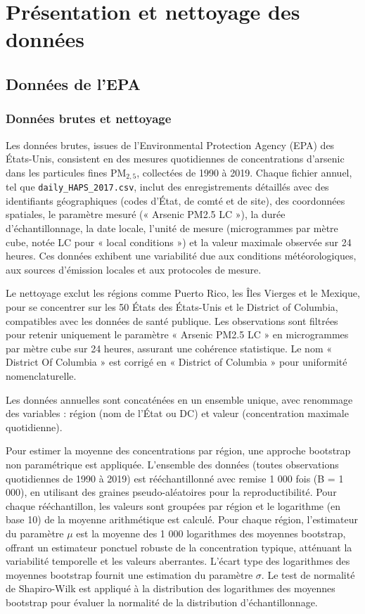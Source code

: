 \chapter{Présentation et nettoyage des données}
\label{chap:data}

\section{Données de l'EPA}

\subsection{Données brutes et nettoyage}

Les données brutes, issues de l'Environmental Protection Agency (EPA) \citep{epa_air_quality_system_2024} des États-Unis, consistent en des mesures quotidiennes de concentrations d'arsenic dans les particules fines PM$_{2{,}5}$, collectées de 1990 à 2019. Chaque fichier annuel, tel que \texttt{daily\_HAPS\_2017.csv}, inclut des enregistrements détaillés avec des identifiants géographiques (codes d'État, de comté et de site), des coordonnées spatiales, le paramètre mesuré (« Arsenic PM2.5 LC »), la durée d'échantillonnage, la date locale, l'unité de mesure (microgrammes par mètre cube, notée LC pour « local conditions ») et la valeur maximale observée sur 24 heures. Ces données exhibent une variabilité due aux conditions météorologiques, aux sources d'émission locales et aux protocoles de mesure.

Le nettoyage exclut les régions comme Puerto Rico, les Îles Vierges et le Mexique, pour se concentrer sur les 50 États des États-Unis et le District of Columbia, compatibles avec les données de santé publique. Les observations sont filtrées pour retenir uniquement le paramètre « Arsenic PM2.5 LC » en microgrammes par mètre cube sur 24 heures, assurant une cohérence statistique. Le nom « District Of Columbia » est corrigé en « District of Columbia » pour uniformité nomenclaturelle.

Les données annuelles sont concaténées en un ensemble unique, avec renommage des variables : région (nom de l'État ou DC) et valeur (concentration maximale quotidienne).

Pour estimer la moyenne des concentrations par région, une approche bootstrap non paramétrique est appliquée. L'ensemble des données (toutes observations quotidiennes de 1990 à 2019) est rééchantillonné avec remise 1 000 fois (B = 1 000), en utilisant des graines pseudo-aléatoires pour la reproductibilité. Pour chaque rééchantillon, les valeurs sont groupées par région et le logarithme (en base 10) de la moyenne arithmétique est calculé. Pour chaque région, l'estimateur du paramètre $\mu$ est la moyenne des 1 000 logarithmes des moyennes bootstrap, offrant un estimateur ponctuel robuste de la concentration typique, atténuant la variabilité temporelle et les valeurs aberrantes. L'écart type des logarithmes des moyennes bootstrap fournit une estimation du paramètre $\sigma$. Le test de normalité de Shapiro-Wilk est appliqué à la distribution des logarithmes des moyennes bootstrap pour évaluer la normalité de la distribution d'échantillonnage.

